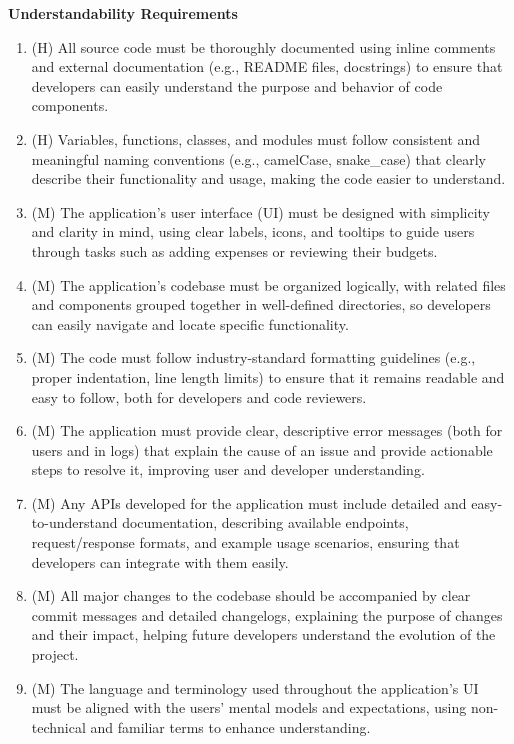 \documentclass[12pt]{article}
\begin{document}
\textbf{Understandability Requirements} 
\begin{enumerate}[label=NFR-UND-\arabic*]
  \item (H) All source code must be thoroughly documented using inline comments
  and external documentation (e.g., README files, docstrings) to ensure that
  developers can easily understand the purpose and behavior of code components.
  \item (H) Variables, functions, classes, and modules must follow consistent
  and meaningful naming conventions (e.g., camelCase, snake\_case) that clearly
  describe their functionality and usage, making the code easier to understand.
  \item (M) The application's user interface (UI) must be designed with
  simplicity and clarity in mind, using clear labels, icons, and tooltips to
  guide users through tasks such as adding expenses or reviewing their budgets.
  \item (M) The application's codebase must be organized logically, with related
  files and components grouped together in well-defined directories, so
  developers can easily navigate and locate specific functionality.
  \item (M) The code must follow industry-standard formatting guidelines (e.g.,
  proper indentation, line length limits) to ensure that it remains readable and
  easy to follow, both for developers and code reviewers.
  \item (M) The application must provide clear, descriptive error messages (both
  for users and in logs) that explain the cause of an issue and provide
  actionable steps to resolve it, improving user and developer understanding.
  \item (M) Any APIs developed for the application must include detailed and
  easy-to-understand documentation, describing available endpoints,
  request/response formats, and example usage scenarios, ensuring that
  developers can integrate with them easily.
  \item (M) All major changes to the codebase should be accompanied by clear
  commit messages and detailed changelogs, explaining the purpose of changes and
  their impact, helping future developers understand the evolution of the
  project.
  \item (M) The language and terminology used throughout the application's UI
  must be aligned with the users' mental models and expectations, using
  non-technical and familiar terms to enhance understanding.
\end{enumerate}
\end{document}
